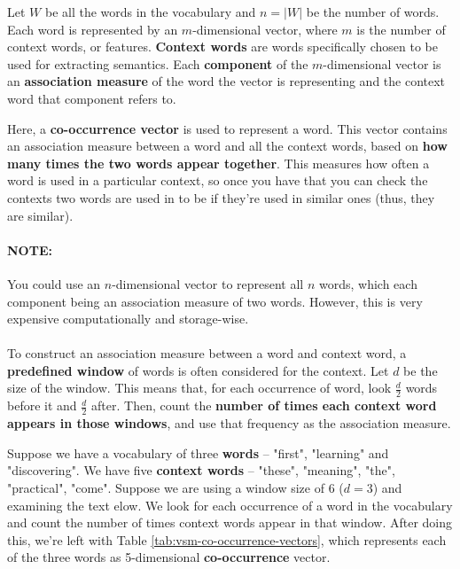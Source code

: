\documentclass{article}
\begin{document}
Let $W$ be all the words in the vocabulary and $n = |W|$ be the number of words. Each word is represented by an $m$-dimensional vector, where $m$ is the number of context words, or features. \textbf{Context words} are words specifically chosen to be used for extracting semantics.  Each \textbf{component} of the $m$-dimensional vector is an \textbf{association measure} of the word the vector is representing and the context word that component refers to. 

Here, a \textbf{co-occurrence vector} is used to represent a word. This vector contains an association measure between a word and all the context words, based on \textbf{how many times the two words appear together}. This measures how often a word is used in a particular context, so once you have that you can check the contexts two words are used in to be if they're used in similar ones (thus, they are similar).

\paragraph{\textbf{NOTE:} } You could use an $n$-dimensional vector to represent all $n$ words, which each component being an association measure of two words. However, this is very expensive computationally and storage-wise.
\paragraph{}

To construct an association measure between a word and context word, a \textbf{predefined window} of words is often considered for the context. Let $d$ be the size of the window. This means that, for each occurrence of word, look $\frac{d}{2}$ words before it and $\frac{d}{2}$ after. Then, count the \textbf{number of times each context word appears in those windows}, and use that frequency as the association measure.

Suppose we have a vocabulary of three \textbf{words} -- "first", "learning" and "discovering". We have five \textbf{context words} -- "these", "meaning", "the", "practical", "come". Suppose we are using a window size of 6 ($d = 3$) and examining the text elow. We look for each occurrence of a word in the vocabulary and count the number of times context words appear in that window. After doing this, we're left with Table \ref{tab:vsm-co-occurrence-vectors}, which represents each of the three words as 5-dimensional \textbf{co-occurrence} vector.
\end{document}
